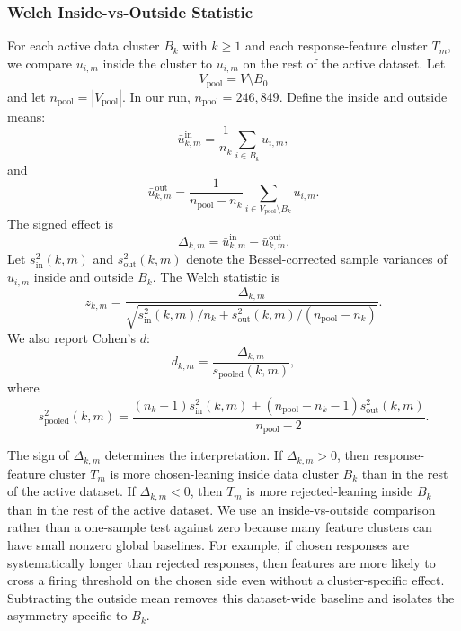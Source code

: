 \documentclass{article} %
\begin{document}
\subsubsection{Welch Inside-vs-Outside Statistic}
\label{app:ftd-welch}

For each active data cluster $B_k$ with $k\geq 1$ and each response-feature cluster $T_m$, we compare $u_{i,m}$ inside the cluster to $u_{i,m}$ on the rest of the active dataset. Let
\begin{equation}
V_{\text{pool}} = V\setminus B_0
\end{equation}
and let $n_{\text{pool}}=|V_{\text{pool}}|$. In our run, $n_{\text{pool}}=246{,}849$. Define the inside and outside means:
\begin{equation}
\bar{u}^{\text{in}}_{k,m} = \frac{1}{n_k}\sum_{i\in B_k}u_{i,m},
\end{equation}
and
\begin{equation}
\bar{u}^{\text{out}}_{k,m} = \frac{1}{n_{\text{pool}}-n_k}\sum_{i\in V_{\text{pool}}\setminus B_k}u_{i,m}.
\end{equation}
The signed effect is
\begin{equation}
\Delta_{k,m} = \bar{u}^{\text{in}}_{k,m} - \bar{u}^{\text{out}}_{k,m}.
\end{equation}
Let $s^2_{\text{in}}(k,m)$ and $s^2_{\text{out}}(k,m)$ denote the Bessel-corrected sample variances of $u_{i,m}$ inside and outside $B_k$. The Welch statistic is
\begin{equation}
z_{k,m} = \frac{\Delta_{k,m}}{\sqrt{s^2_{\text{in}}(k,m)/n_k + s^2_{\text{out}}(k,m)/(n_{\text{pool}}-n_k)}}.
\end{equation}
We also report Cohen's $d$:
\begin{equation}
d_{k,m} = \frac{\Delta_{k,m}}{s_{\text{pooled}}(k,m)},
\end{equation}
where
\begin{equation}
s^2_{\text{pooled}}(k,m) = \frac{(n_k-1)s^2_{\text{in}}(k,m) + (n_{\text{pool}}-n_k-1)s^2_{\text{out}}(k,m)}{n_{\text{pool}}-2}.
\end{equation}

The sign of $\Delta_{k,m}$ determines the interpretation. If $\Delta_{k,m}>0$, then response-feature cluster $T_m$ is more chosen-leaning inside data cluster $B_k$ than in the rest of the active dataset. If $\Delta_{k,m}<0$, then $T_m$ is more rejected-leaning inside $B_k$ than in the rest of the active dataset. We use an inside-vs-outside comparison rather than a one-sample test against zero because many feature clusters can have small nonzero global baselines. For example, if chosen responses are systematically longer than rejected responses, then features are more likely to cross a firing threshold on the chosen side even without a cluster-specific effect. Subtracting the outside mean removes this dataset-wide baseline and isolates the asymmetry specific to $B_k$.
\end{document}
